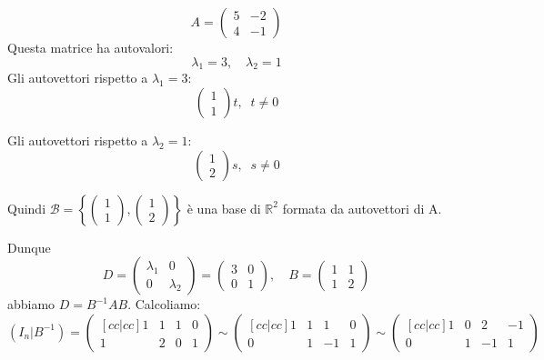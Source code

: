 \documentclass[a4paper]{article}
\theoremstyle{break}
\theoremstyle{break}
\theoremstyle{break}
\theoremstyle{break}
\begin{document}
\begin{example}
  \[
  A = \begin{pmatrix} 
    5 & -2\\
    4 & -1
  \end{pmatrix} 
  \] 
  Questa matrice ha autovalori:
  \[
  \lambda_1 = 3, \quad \lambda_2 = 1
  \] 
  Gli autovettori rispetto a \( \lambda_1 = 3 \):
  \[
  \begin{pmatrix} 
    1\\
    1
  \end{pmatrix} 
  t,\;\; t \neq 0
  \] 

\noindent  Gli autovettori rispetto a \( \lambda_2 = 1 \):
  \[
  \begin{pmatrix} 
    1\\
    2
  \end{pmatrix}
  s,\;\; s \neq 0
  \]

\noindent  Quindi \( \mathcal{B} = \left\{ \begin{pmatrix} 1\\1 \end{pmatrix},
  \begin{pmatrix} 1\\2 \end{pmatrix} \right\}   \) è una base di \( \mathbb{R}^2 \)
  formata da autovettori di A.

  \vspace{1em}
  \noindent Dunque
  \[
  D = \begin{pmatrix} 
    \lambda_1 & 0\\
    0 & \lambda_2
  \end{pmatrix} 
  =
  \begin{pmatrix} 
    3 & 0\\
    0 & 1
  \end{pmatrix} ,\quad
  B = \begin{pmatrix} 
    1 & 1\\
    1 & 2
  \end{pmatrix} 
  \] 
  abbiamo \( D = B^{-1}AB \). Calcoliamo:
  \[
    (I_n|B^{-1}) = \begin{pmatrix}[cc|cc]
      1 & 1 & 1 & 0\\
      1 & 2 & 0 & 1
    \end{pmatrix} 
    \sim
    \begin{pmatrix}[cc|cc]
      1 & 1 & 1 & 0\\
      0 & 1 & -1 & 1
    \end{pmatrix} 
    \sim
    \begin{pmatrix}[cc|cc]
      1 & 0 & 2 & -1\\
      0 & 1 & -1 & 1
    \end{pmatrix} 
  \] 


\end{example}
\end{document}
